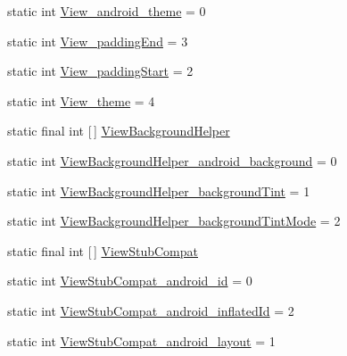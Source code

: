 \begin{DoxyCompactItemize}
\item 
static int \hyperlink{classandroid_1_1support_1_1v7_1_1cardview_1_1R_1_1styleable_a977968b5162426b04e4c0f785248e889}{View\+\_\+android\+\_\+theme} = 0
\item 
static int \hyperlink{classandroid_1_1support_1_1v7_1_1cardview_1_1R_1_1styleable_ac75d4392262bd8cc266e0e0f62558b0a}{View\+\_\+padding\+End} = 3
\item 
static int \hyperlink{classandroid_1_1support_1_1v7_1_1cardview_1_1R_1_1styleable_af3ab4c9945e99c8800d0a26c042be3e5}{View\+\_\+padding\+Start} = 2
\item 
static int \hyperlink{classandroid_1_1support_1_1v7_1_1cardview_1_1R_1_1styleable_a7152ff8c1f1b8c910d28540824081033}{View\+\_\+theme} = 4
\item 
static final int \mbox{[}$\,$\mbox{]} \hyperlink{classandroid_1_1support_1_1v7_1_1cardview_1_1R_1_1styleable_a5b548c410f0942ef83e14ce4020235ca}{View\+Background\+Helper}
\item 
static int \hyperlink{classandroid_1_1support_1_1v7_1_1cardview_1_1R_1_1styleable_a7a3a9b0fb886ee19df2600f390bc2839}{View\+Background\+Helper\+\_\+android\+\_\+background} = 0
\item 
static int \hyperlink{classandroid_1_1support_1_1v7_1_1cardview_1_1R_1_1styleable_aacbc5a77ebb6f89cb3645b863dd8b7f4}{View\+Background\+Helper\+\_\+background\+Tint} = 1
\item 
static int \hyperlink{classandroid_1_1support_1_1v7_1_1cardview_1_1R_1_1styleable_a79e46c7414583bac85ce50861d5c8ad0}{View\+Background\+Helper\+\_\+background\+Tint\+Mode} = 2
\item 
static final int \mbox{[}$\,$\mbox{]} \hyperlink{classandroid_1_1support_1_1v7_1_1cardview_1_1R_1_1styleable_a3c298cbf9f98a627c6843548f42a8a58}{View\+Stub\+Compat}
\item 
static int \hyperlink{classandroid_1_1support_1_1v7_1_1cardview_1_1R_1_1styleable_a9135acff115a1e0970d5d0c6d23437f8}{View\+Stub\+Compat\+\_\+android\+\_\+id} = 0
\item 
static int \hyperlink{classandroid_1_1support_1_1v7_1_1cardview_1_1R_1_1styleable_ac4cf4cb0039849e872a908401c61ea4f}{View\+Stub\+Compat\+\_\+android\+\_\+inflated\+Id} = 2
\item 
static int \hyperlink{classandroid_1_1support_1_1v7_1_1cardview_1_1R_1_1styleable_a8858b7484f9db791e71043e41d83a4c0}{View\+Stub\+Compat\+\_\+android\+\_\+layout} = 1
\end{DoxyCompactItemize}


